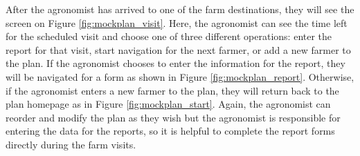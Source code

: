 \newpage
\noindent
After the agronomist has arrived to one of the farm destinations, they will see the screen on Figure \ref{fig:mockplan_visit}. Here, the agronomist can see the time left for the scheduled visit and choose one of three different operations: enter the report for that visit, start navigation for the next farmer, or add a new farmer to the plan. If the agronomist chooses to enter the information for the report, they will be navigated for a form as shown in Figure \ref{fig:mockplan_report}. Otherwise, if the agronomist enters a new farmer to the plan, they will return back to the plan homepage as in Figure \ref{fig:mockplan_start}. Again, the agronomist can reorder and modify the plan as they wish but the agronomist is responsible for entering the data for the reports, so it is helpful to complete the report forms directly during the farm visits.


